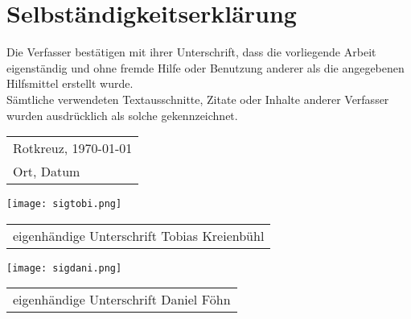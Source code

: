 \clearpage
\thispagestyle{empty}
\section*{Selbständigkeitserklärung}
Die Verfasser bestätigen mit ihrer Unterschrift, dass die vorliegende Arbeit eigenständig und ohne fremde Hilfe oder Benutzung anderer als die angegebenen Hilfsmittel erstellt wurde.\\Sämtliche verwendeten Textausschnitte, Zitate oder Inhalte anderer Verfasser wurden ausdrücklich als solche gekennzeichnet.

\vspace{2cm}
\begin{tabular}{@{}l@{}}
    Rotkreuz, \today\\
    Ort, Datum
\end{tabular}
\vspace{10cm}

\texttt{[image: sigtobi.png]}\\
\begin{tabular}{@{}l@{}}\hline
    eigenhändige Unterschrift Tobias Kreienbühl
\end{tabular}
\vspace{2cm}

\texttt{[image: sigdani.png]}\\
\begin{tabular}{@{}l@{}}\hline
    eigenhändige Unterschrift Daniel Föhn
\end{tabular}
\vspace{2cm}

\clearpage
